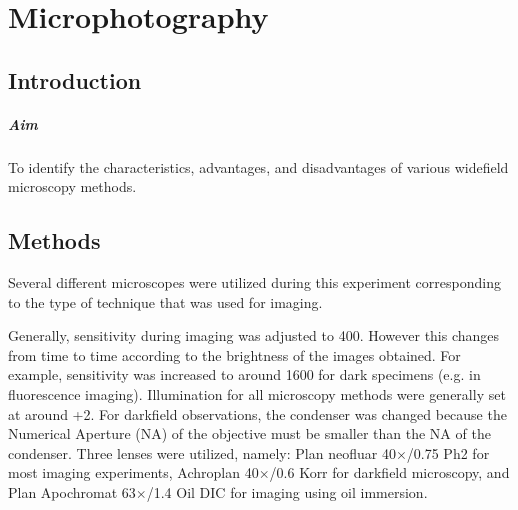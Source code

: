 
\chapter{Microphotography}
\label{chp:Microphotography}

\section{Introduction}

\paragraph{Aim} To identify the characteristics, advantages, and disadvantages of various widefield microscopy methods.


\section{Methods}

Several different microscopes were utilized during this experiment corresponding to the type of technique that was used for imaging. 

Generally, sensitivity during imaging was adjusted to 400. However this changes from time to time according to the brightness of the images obtained. 
For example, sensitivity was increased to around 1600 for dark specimens (e.g. in fluorescence imaging). 
Illumination for all microscopy methods were generally set at around +2. 
For darkfield observations, the condenser was changed because the Numerical Aperture (NA) of the objective must be smaller than the NA of the condenser. 
Three lenses were utilized, namely: Plan neofluar 40$\times$/0.75 Ph2 for most imaging experiments, Achroplan 40$\times$/0.6 Korr for darkfield microscopy, and Plan Apochromat 63$\times$/1.4 Oil DIC for imaging using oil immersion.

